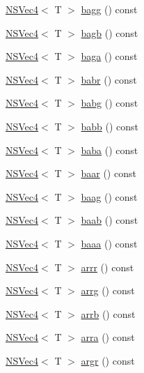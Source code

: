 \begin{DoxyCompactItemize}
\item 
\hyperlink{structNSVec4}{N\-S\-Vec4}$<$ T $>$ \hyperlink{structNSVec4_ac804febd710105d594fb2c0bf2870df0}{bagg} () const 
\item 
\hyperlink{structNSVec4}{N\-S\-Vec4}$<$ T $>$ \hyperlink{structNSVec4_a6a90931e084b13273769a567e10cc9fc}{bagb} () const 
\item 
\hyperlink{structNSVec4}{N\-S\-Vec4}$<$ T $>$ \hyperlink{structNSVec4_abf3920a2ca020d282536a6b21202f004}{baga} () const 
\item 
\hyperlink{structNSVec4}{N\-S\-Vec4}$<$ T $>$ \hyperlink{structNSVec4_accad85942dfc98ed773670cf7ed76a9c}{babr} () const 
\item 
\hyperlink{structNSVec4}{N\-S\-Vec4}$<$ T $>$ \hyperlink{structNSVec4_a71068e51b275302283676a008a8289db}{babg} () const 
\item 
\hyperlink{structNSVec4}{N\-S\-Vec4}$<$ T $>$ \hyperlink{structNSVec4_a952933b8576a430eb9923fed3f2c6f45}{babb} () const 
\item 
\hyperlink{structNSVec4}{N\-S\-Vec4}$<$ T $>$ \hyperlink{structNSVec4_a71d3d70cd1856c397337abe85326d43f}{baba} () const 
\item 
\hyperlink{structNSVec4}{N\-S\-Vec4}$<$ T $>$ \hyperlink{structNSVec4_a6571f105b5ca09bce5bdb6a6a04f27ec}{baar} () const 
\item 
\hyperlink{structNSVec4}{N\-S\-Vec4}$<$ T $>$ \hyperlink{structNSVec4_ac877005f9671c318a54849644c9e47f0}{baag} () const 
\item 
\hyperlink{structNSVec4}{N\-S\-Vec4}$<$ T $>$ \hyperlink{structNSVec4_abdaa653d828df14f7746a31ab5db8cce}{baab} () const 
\item 
\hyperlink{structNSVec4}{N\-S\-Vec4}$<$ T $>$ \hyperlink{structNSVec4_a7f7046b3654c96e50cf88765cc388a56}{baaa} () const 
\item 
\hyperlink{structNSVec4}{N\-S\-Vec4}$<$ T $>$ \hyperlink{structNSVec4_a5958d6b00074d98ca9cc1bcb2df4dd9a}{arrr} () const 
\item 
\hyperlink{structNSVec4}{N\-S\-Vec4}$<$ T $>$ \hyperlink{structNSVec4_a523e0d6b8f9f587e636d17f1c293ffb1}{arrg} () const 
\item 
\hyperlink{structNSVec4}{N\-S\-Vec4}$<$ T $>$ \hyperlink{structNSVec4_a4c1de004deeb45af977f172d4acf4f6d}{arrb} () const 
\item 
\hyperlink{structNSVec4}{N\-S\-Vec4}$<$ T $>$ \hyperlink{structNSVec4_a7f23fef44d4d412c9dda3344e2704446}{arra} () const 
\item 
\hyperlink{structNSVec4}{N\-S\-Vec4}$<$ T $>$ \hyperlink{structNSVec4_a2f30074827f1242809b5bad06404ed14}{argr} () const 

\end{DoxyCompactItemize}
